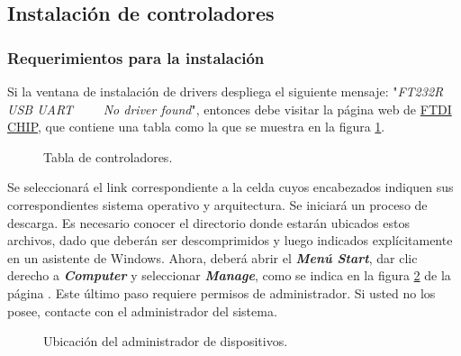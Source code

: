 \subsection{Instalación de controladores}\label{subsec:Error} %
\subsubsection{Requerimientos para la instalación}
Si la ventana de instalación de drivers despliega el siguiente mensaje: "\textit{FT232R USB UART \ \ \ \ No driver found}", entonces debe visitar la página web de \href{http://www.ftdichip.com/Drivers/VCP.htm}{FTDI CHIP}\footnotemark, que contiene una tabla como la que se muestra en la figura \ref{fig:TablaCont}.


\begin{figure}[H] %
\caption{Tabla de controladores.}
\label{fig:TablaCont}
\end{figure}

Se seleccionará el link correspondiente a la celda cuyos encabezados indiquen sus correspondientes sistema operativo y arquitectura. Se iniciará un proceso de descarga. Es necesario conocer el directorio donde estarán ubicados estos archivos, dado que deberán ser descomprimidos y luego indicados explícitamente en un asistente de Windows. Ahora, deberá abrir el \textbf{\textit{Menú Start}}, dar clic derecho a \textbf{\textit{Computer}} y seleccionar \textbf{\textit{Manage}}, como se indica en la figura \ref{fig:Man1} de la página \pageref{fig:Man1}. Este último paso requiere permisos de administrador. Si usted no los posee, contacte con el administrador del sistema.

\begin{figure}[H] %
\caption[1]{Ubicación del administrador de dispositivos.}
\label{fig:Man1}
\end{figure}

